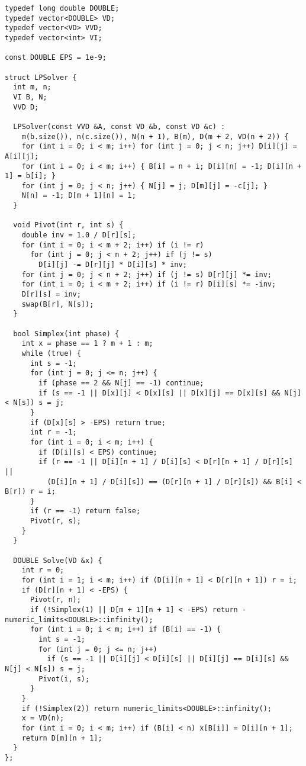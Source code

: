 \documentclass[letterpaper]{article}
\begin{document}
\begin{lstlisting}
typedef long double DOUBLE;
typedef vector<DOUBLE> VD;
typedef vector<VD> VVD;
typedef vector<int> VI;

const DOUBLE EPS = 1e-9;

struct LPSolver {
  int m, n;
  VI B, N;
  VVD D;

  LPSolver(const VVD &A, const VD &b, const VD &c) :
    m(b.size()), n(c.size()), N(n + 1), B(m), D(m + 2, VD(n + 2)) {
    for (int i = 0; i < m; i++) for (int j = 0; j < n; j++) D[i][j] = A[i][j];
    for (int i = 0; i < m; i++) { B[i] = n + i; D[i][n] = -1; D[i][n + 1] = b[i]; }
    for (int j = 0; j < n; j++) { N[j] = j; D[m][j] = -c[j]; }
    N[n] = -1; D[m + 1][n] = 1;
  }

  void Pivot(int r, int s) {
    double inv = 1.0 / D[r][s];
    for (int i = 0; i < m + 2; i++) if (i != r)
      for (int j = 0; j < n + 2; j++) if (j != s)
        D[i][j] -= D[r][j] * D[i][s] * inv;
    for (int j = 0; j < n + 2; j++) if (j != s) D[r][j] *= inv;
    for (int i = 0; i < m + 2; i++) if (i != r) D[i][s] *= -inv;
    D[r][s] = inv;
    swap(B[r], N[s]);
  }

  bool Simplex(int phase) {
    int x = phase == 1 ? m + 1 : m;
    while (true) {
      int s = -1;
      for (int j = 0; j <= n; j++) {
        if (phase == 2 && N[j] == -1) continue;
        if (s == -1 || D[x][j] < D[x][s] || D[x][j] == D[x][s] && N[j] < N[s]) s = j;
      }
      if (D[x][s] > -EPS) return true;
      int r = -1;
      for (int i = 0; i < m; i++) {
        if (D[i][s] < EPS) continue;
        if (r == -1 || D[i][n + 1] / D[i][s] < D[r][n + 1] / D[r][s] ||
          (D[i][n + 1] / D[i][s]) == (D[r][n + 1] / D[r][s]) && B[i] < B[r]) r = i;
      }
      if (r == -1) return false;
      Pivot(r, s);
    }
  }

  DOUBLE Solve(VD &x) {
    int r = 0;
    for (int i = 1; i < m; i++) if (D[i][n + 1] < D[r][n + 1]) r = i;
    if (D[r][n + 1] < -EPS) {
      Pivot(r, n);
      if (!Simplex(1) || D[m + 1][n + 1] < -EPS) return -numeric_limits<DOUBLE>::infinity();
      for (int i = 0; i < m; i++) if (B[i] == -1) {
        int s = -1;
        for (int j = 0; j <= n; j++)
          if (s == -1 || D[i][j] < D[i][s] || D[i][j] == D[i][s] && N[j] < N[s]) s = j;
        Pivot(i, s);
      }
    }
    if (!Simplex(2)) return numeric_limits<DOUBLE>::infinity();
    x = VD(n);
    for (int i = 0; i < m; i++) if (B[i] < n) x[B[i]] = D[i][n + 1];
    return D[m][n + 1];
  }
};

\end{lstlisting}
\end{document}
